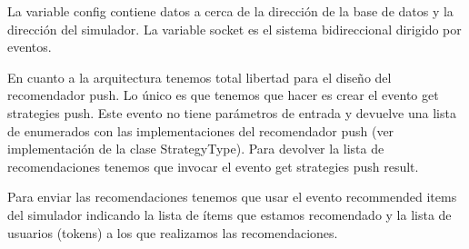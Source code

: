 La variable config contiene datos a cerca de la dirección de la base de datos y la dirección del simulador. La variable socket es el sistema bidireccional dirigido por eventos. 

En cuanto a la arquitectura tenemos total libertad para el diseño del recomendador push. Lo único es que tenemos que hacer es crear el evento get strategies push. Este evento no tiene parámetros de entrada y devuelve una lista de enumerados con las implementaciones del recomendador push (ver implementación de la clase StrategyType). Para devolver la lista de recomendaciones tenemos que invocar el evento get strategies push result.

Para enviar las recomendaciones tenemos que usar el evento recommended items del simulador indicando la lista de ítems que estamos recomendado y la lista de usuarios (tokens) a los que realizamos las recomendaciones.
